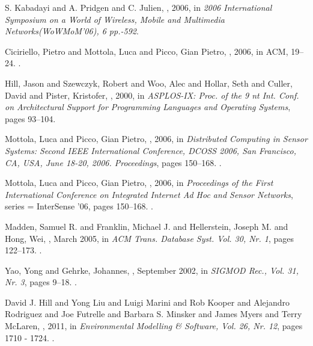 \documentclass[USenglish]{uit-thesis}
\begin{document}
\begin{thebibliography}{9}
S. Kabadayi and A. Pridgen and C. Julien,
, 2006,
\newblock in {\em 2006 International Symposium on a World of Wireless, Mobile and Multimedia Networks(WoWMoM'06), 6 pp.-592}.

Ciciriello, Pietro and Mottola, Luca and Picco, Gian Pietro,
, 2006,
\newblock in {ACM, 19--24}.
.

Hill, Jason and Szewczyk, Robert and Woo, Alec and Hollar, Seth and Culler, David and Pister, Kristofer,
, 2000,
\newblock in {\em  ASPLOS-IX: Proc. of the 9 nt Int. Conf. on
Architectural Support for Programming Languages and
Operating Systems}, pages 93–104.

Mottola, Luca and Picco, Gian Pietro,
, 2006,
\newblock in {\em  Distributed Computing in Sensor Systems: Second IEEE International Conference, DCOSS 2006, San Francisco, CA, USA, June 18-20, 2006. Proceedings}, pages 150--168.
.

Mottola, Luca and Picco, Gian Pietro,
, 2006,
\newblock in {\em  Proceedings of the First International Conference on Integrated Internet Ad Hoc and Sensor Networks},
 series = {InterSense '06}, pages 150--168.
.

Madden, Samuel R. and Franklin, Michael J. and Hellerstein, Joseph M. and Hong, Wei,
, March 2005,
\newblock in {\em  ACM Trans. Database Syst. Vol. 30, Nr. 1}, pages 122--173.
.

Yao, Yong and Gehrke, Johannes,
, September 2002,
\newblock in {\em  SIGMOD Rec., Vol. 31, Nr. 3}, pages 9--18.
.

David J. Hill and Yong Liu and Luigi Marini and Rob Kooper and Alejandro Rodriguez and Joe Futrelle and Barbara S. Minsker and James Myers and Terry McLaren,
, 2011,
\newblock in {\em  Environmental Modelling \& Software, Vol. 26, Nr. 12}, pages 1710 - 1724.
.



\end{thebibliography}
\end{document}
